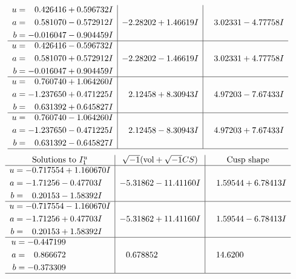 \documentclass[1p]{elsarticle_modified}
\theoremstyle{definition}
\newcommand{\I}{\sqrt{-1}}
\begin{document}
$$\begin{array}{c|c|c}
\begin{aligned}
u &= \phantom{-}0.426416 + 0.596732 I \\
a &= \phantom{-}0.581070 - 0.572912 I \\
b &= -0.016047 - 0.904459 I\end{aligned}
 & -2.28202 + 1.46619 I & \phantom{-}3.02331 - 4.77758 I \\ \hline\begin{aligned}
u &= \phantom{-}0.426416 - 0.596732 I \\
a &= \phantom{-}0.581070 + 0.572912 I \\
b &= -0.016047 + 0.904459 I\end{aligned}
 & -2.28202 - 1.46619 I & \phantom{-}3.02331 + 4.77758 I \\ \hline\begin{aligned}
u &= \phantom{-}0.760740 + 1.064260 I \\
a &= -1.237650 + 0.471225 I \\
b &= \phantom{-}0.631392 + 0.645827 I\end{aligned}
 & \phantom{-}2.12458 + 8.30943 I & \phantom{-}4.97203 - 7.67433 I \\ \hline\begin{aligned}
u &= \phantom{-}0.760740 - 1.064260 I \\
a &= -1.237650 - 0.471225 I \\
b &= \phantom{-}0.631392 - 0.645827 I\end{aligned}
 & \phantom{-}2.12458 - 8.30943 I & \phantom{-}4.97203 + 7.67433 I\\
 \hline 
 \end{array}$$\newpage$$\begin{array}{c|c|c}  
\text{Solutions to }I^u_{1}& \I (\text{vol} + \sqrt{-1}CS) & \text{Cusp shape}\\
 \hline 
\begin{aligned}
u &= -0.717554 + 1.160670 I \\
a &= -1.71256 - 0.47703 I \\
b &= \phantom{-}0.20153 - 1.58392 I\end{aligned}
 & -5.31862 - 11.41160 I & \phantom{-}1.59544 + 6.78413 I \\ \hline\begin{aligned}
u &= -0.717554 - 1.160670 I \\
a &= -1.71256 + 0.47703 I \\
b &= \phantom{-}0.20153 + 1.58392 I\end{aligned}
 & -5.31862 + 11.41160 I & \phantom{-}1.59544 - 6.78413 I \\ \hline\begin{aligned}
u &= -0.447199\phantom{ +0.000000I} \\
a &= \phantom{-}0.866672\phantom{ +0.000000I} \\
b &= -0.373309\phantom{ +0.000000I}\end{aligned}
 & \phantom{-}0.678852\phantom{ +0.000000I} & \phantom{-}14.6200\phantom{ +0.000000I}\\
 \hline 
 \end{array}$$\newpage\newpage\renewcommand{\arraystretch}{1}
\end{document}
